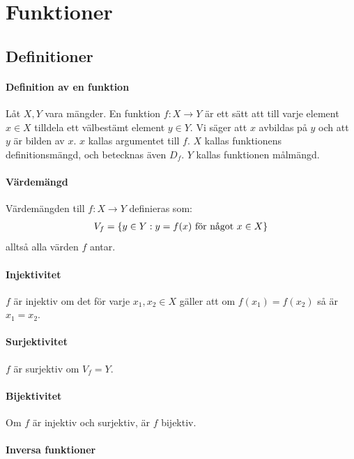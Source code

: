 \section{Funktioner}

\subsection{Definitioner}

\paragraph{Definition av en funktion}

Låt $X, Y$ vara mängder. En funktion $f: X\to Y$ är ett sätt att till varje element $x \in X$ tilldela ett välbestämt element $y\in Y$. Vi säger att $x$ avbildas på $y$ och att $y$ är bilden av $x$. $x$ kallas argumentet till $f$. $X$ kallas funktionens definitionsmängd, och betecknas även $D_f$. $Y$ kallas funktionen målmängd.

\paragraph{Värdemängd}

Värdemängden till $f: X\rightarrow Y$ definieras som:
\begin{align}
	V_f=\left \{y\in Y: y=f(x)\textnormal{ för något }x\in X\right \}\nonumber
\end{align}
alltså alla värden $f$ antar.

\paragraph{Injektivitet}

$f$ är injektiv om det för varje $x_1, x_2 \in X$ gäller att om $f(x_1)=f(x_2)$ så är $x_1=x_2$.

\paragraph{Surjektivitet}

$f$ är surjektiv om $V_f=Y$.

\paragraph{Bijektivitet}

Om $f$ är injektiv och surjektiv, är $f$ bijektiv.

\paragraph{Inversa funktioner}

